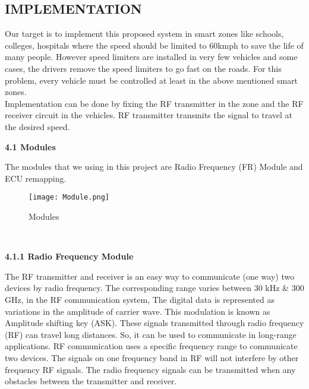 \documentclass[a4paper,12pt, English]{article}
\begin{document}
\begin{normalsize}
\begin{center}
\section{ \Large IMPLEMENTATION}
\end{center}
\newline
Our target is to implement this proposed system in smart
zones like schools, colleges, hospitals where the speed
should be limited to 60kmph to save the life of many people.
However speed limiters are installed in very few vehicles
and some cases, the drivers remove the speed limiters to go
fast on the roads. For this problem, every vehicle must be
controlled at least in the above mentioned smart zones.
\\
Implementation can be done by fixing the RF
transmitter in the zone and the
RF receiver circuit in the vehicles. RF transmitter 
transmits the signal to travel at the desired speed.
\\
\begin{large}
\textbf{4.1 Modules }
\end{large}
\newline
The modules that we using in this project are Radio Frequency (FR) Module and
ECU remapping.\\
\begin{figure}[htb]
\begin{center}
\texttt{[image: Module.png]}
\end{center}
\begin{center}
\renewcommand{\thefigure}{4.1.1}
\caption{\footnotesize Modules}
\end{center}
\end{figure}\\
\begin{large}
\textbf{4.1.1 Radio Frequency Module }
\end{large}
\newline
The RF transmitter and receiver is an easy way to communicate (one way) two devices by radio frequency. The corresponding range varies between 30 kHz & 300 GHz, in the RF communication system, The digital data is represented as variations in the amplitude of carrier wave. This modulation is known as Amplitude shifting key (ASK). These signals transmitted through radio frequency (RF) can travel long distances. So, it can be used to communicate in long-range applications. RF communication uses a specific frequency range to communicate two devices. The signals on one frequency band in RF will not interfere by other frequency RF signals. The radio frequency signals can be transmitted when any obstacles between the transmitter and receiver.\\

\end{normalsize}
\end{document}
